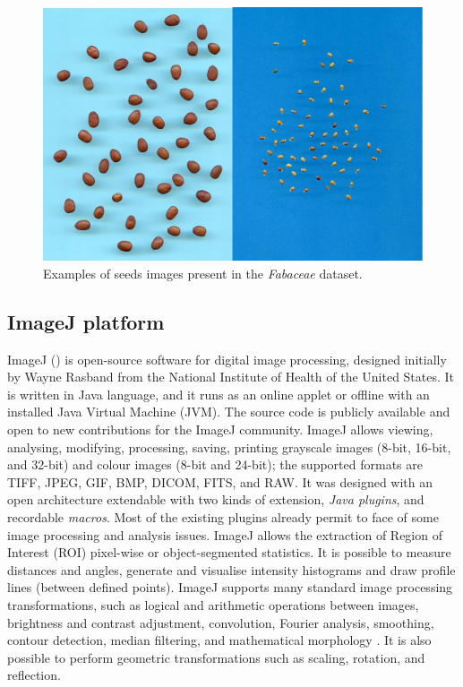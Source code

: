 \documentclass[twocolumn]{svjour3}           %
\begin{document}
\begin{figure}[tbp]
	\centerline{\includegraphics[scale=0.5]{fig_sardinia.jpg}}
	\caption{Examples of seeds images present in the \emph{Fabaceae} dataset.}
	\label{Sardinia}
\end{figure}

\subsection{ImageJ platform}
\label{sec:imagej}
ImageJ (\cite{ImageJ}) is open-source software for digital image processing, designed initially by Wayne Rasband from the National Institute of Health of the United States. It is written in Java language, and it runs as an online applet or offline with an installed Java Virtual Machine (JVM). The source code is publicly available and open to new contributions for the ImageJ community. ImageJ allows viewing, analysing, modifying, processing, saving, printing grayscale images (8-bit, 16-bit, and 32-bit) and colour images (8-bit and 24-bit); the supported formats are TIFF, JPEG, GIF, BMP, DICOM, FITS, and RAW. It was designed with an open architecture extendable with two kinds of extension, \emph{Java plugins}, and recordable \emph{macros}. Most of the existing plugins already permit to face of some image processing and analysis issues.
ImageJ allows the extraction of Region of Interest (ROI) pixel-wise or object-segmented statistics. It is possible to measure distances and angles, generate and visualise intensity histograms and draw profile lines (between defined points). ImageJ supports many standard image processing transformations, such as logical and arithmetic operations between images, brightness and contrast adjustment, convolution, Fourier analysis, smoothing, contour detection, median filtering, and mathematical morphology \cite{Gonz2018}. It is also possible to perform geometric transformations such as scaling, rotation, and reflection.
\end{document}
